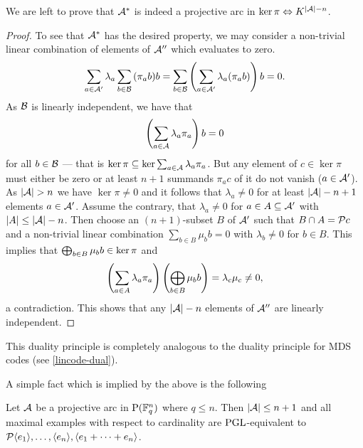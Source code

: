 We are left to prove that $\mathcal{A}^{\ast}$ is indeed a projective arc in $\ker\pi\iso K^{\card\cA-n}$.

\begin{proof}    
To see that $\mathcal{A}^{\ast}$ has the desired property, we may consider a non-trivial linear combination of elements of $\mathcal{A}''$ which evaluates to zero.
$$
\sum_{a\in\mathcal{A}'}{\lambda_a\sum_{b\in\mathcal{B}}{(\pi_a b)b}}=\sum_{b\in\mathcal{B}}{\left(\sum_{a\in\mathcal{A}'}{\lambda_a(\pi_a b)}\right)b}=0.
$$
As $\mathcal{B}$ is linearly independent, we have that
$$
\left(\sum_{a\in\mathcal{A}}{\lambda_a\pi_a}\right)b=0
$$
for all $b\in\mathcal{B}$ --- that is $\ker\pi\subseteq \ker{\sum_{a\in\mathcal{A}}{\lambda_a\pi_a}}$. But any element of $c\in\ker \pi$ must either be zero or at least $n+1$ summands $\pi_a c$ of it do not vanish ($a\in \mathcal{A}'$). As $\card\cA>n$ we have $\ker\pi\neq 0$ and it follows that $\lambda_a\neq 0$ for at least $\left|\mathcal{A}\right|-n+1$ elements $a\in\mathcal{A}'$. Assume the contrary, that $\lambda_a\neq 0$ for $a\in A\subseteq \mathcal{A}'$ with $\left|A\right|\leq \left|\mathcal{A}\right|-n$. Then choose an $(n+1)$-subset $B$ of $\mathcal{A}'$ such that $B\setmeet A=\set{c}$ and a non-trivial linear combination $\sum_{b\in B}{\mu_b b}=0$ with $\lambda_b\neq 0$ for $b\in B$.
This implies that $\bigoplus_{b\in B}{\mu_b b}\in\ker \pi$ and
$$
\left(\sum_{a\in A}{\lambda_a\pi_a}\right)\left(\bigoplus_{b\in B}{\mu_b b}\right)=\lambda_c\mu_c\neq 0, 
$$
a contradiction. This shows that any $\left|\mathcal{A}\right|-n$ elements of $\mathcal{A}''$ are linearly independent.
\end{proof}

This duality principle is completely analogous to the duality principle for MDS codes (see \autoref{lincode-dual}).

A simple fact which is implied by the above is the following
\begin{corollary}\label{mds-ngeqq}
    Let $\mathcal{A}$ be a projective arc in $\P(\field{q}^n)$ where $q\leq n$. Then $\left|\mathcal{A}\right|\leq n+1$ and all maximal examples with respect to cardinality are $\mathrm{PGL}$-equivalent to $\set{\gen{e_1},\ldots,\gen{e_n},\gen{e_1+\cdots+e_n}}$.
\end{corollary}

